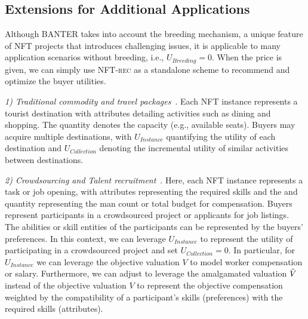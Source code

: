 \documentclass[conference]{IEEEtran}
\newcommand{\1}[1]{\mathds{1}\left[#1\right]}
\theoremstyle{plain}
\newcommand{\eg}{e.g.}
\newcommand{\method}{\textsf{BANTER}\xspace}
\newcommand{\finddemand}{\textsc{NFT-rec}\xspace}
\begin{document}
{\subsection{Extensions for Additional Applications}
\label{appsubsec:extension-application}
    Although \method takes into account the breeding mechanism, a unique feature of NFT projects that introduces challenging issues, it is applicable to many application scenarios without breeding, i.e., $U_\textit{Breeding}=0$. When the price is given, we can simply use \finddemand as a standalone scheme to recommend and optimize the buyer utilities. 

    \textit{1) Traditional commodity and travel packages}~\cite{chen2013travel, liu2011personalized, ge2011cost}. Each NFT instance represents a tourist destination with attributes detailing activities such as dining and shopping. The quantity denotes the capacity (\eg, available seats). Buyers may acquire multiple destinations, with $U_\textit{Instance}$ quantifying the utility of each destination and $U_\textit{Collection}$ denoting the incremental utility of similar activities between destinations. 

    \textit{2) Crowdsourcing and Talent recruitment}~\cite{wang2021efficient, chai2018incentive, zhao2020predictive, yao2022knowledge}. Here, each NFT instance represents a task or job opening, with attributes representing the required skills and the and quantity representing the man count or total budget for compensation. Buyers represent participants in a crowdsourced project or applicants for job listings. The abilities or skill entities of the participants can be represented by the buyers' preferences. In this context, we can leverage $U_\textit{Instance}$ to represent the utility of participating in a crowdsourced project and set $U_\textit{Collection}=0$. In particular, for $U_\textit{Instance}$ we can leverage the objective valuation $V$ to model worker compensation or salary. Furthermore, we can adjust  to leverage the amalgamated valuation $\Tilde{V}$ instead of the objective valuation $V$ to represent the objective compensation weighted by the compatibility of a participant’s skills (preferences) with the required skills (attributes).

}
\end{document}
